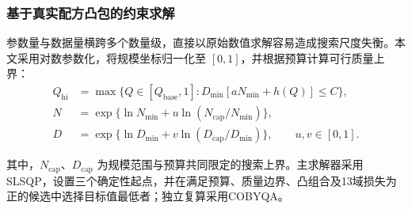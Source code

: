 \documentclass[bwprint]{gmcmthesis}
\begin{document}
\subsubsection{基于真实配方凸包的约束求解}

参数量与数据量横跨多个数量级，直接以原始数值求解容易造成搜索尺度失衡。本文采用对数参数化，将规模坐标归一化至 $[0,1]$，并根据预算计算可行质量上界：
\begin{equation}\label{eq:q3_16}
    \begin{aligned}
        Q_{\mathrm{hi}} & =\max\{Q\in[Q_{\mathrm{base}},1]:D_{\min}[aN_{\min}+h(Q)]\le C\},         \\
        N               & =\exp\{\ln N_{\min}+u\ln(N_{\mathrm{cap}}/N_{\min})\},                    \\
        D               & =\exp\{\ln D_{\min}+v\ln(D_{\mathrm{cap}}/D_{\min})\},\qquad u,v\in[0,1].
    \end{aligned}
\end{equation}

其中，$N_{\mathrm{cap}}$、$D_{\mathrm{cap}}$ 为规模范围与预算共同限定的搜索上界。主求解器采用SLSQP，设置三个确定性起点，并在满足预算、质量边界、凸组合及13域损失为正的候选中选择目标值最低者；独立复算采用COBYQA。
\end{document}
